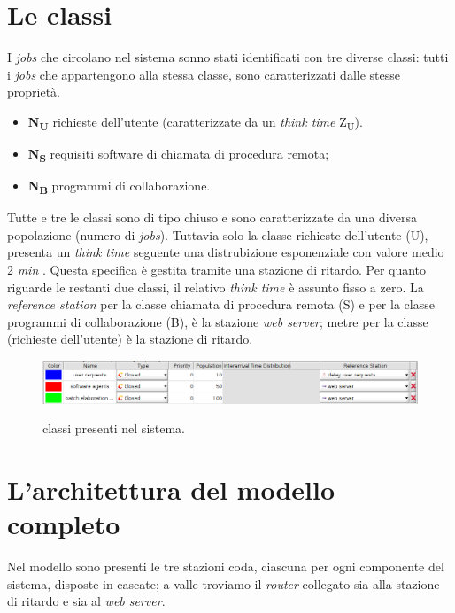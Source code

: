 \documentclass[../main.tex]{subfiles}
\begin{document}
    \section{Le classi}\label{sec:le-classi}
    I \textit{jobs} che circolano nel sistema sonno stati identificati con tre diverse classi: tutti i \textit{jobs}
    che appartengono alla stessa classe, sono caratterizzati dalle stesse proprietà.
    \begin{itemize}
        \item \textbf{N\textsubscript{U}} richieste dell'utente (caratterizzate da un \textit{think time} Z\textsubscript{U}).
        \item \textbf{N\textsubscript{S}} requisiti software di chiamata di procedura remota;
        \item \textbf{N\textsubscript{B}} programmi di collaborazione.
    \end{itemize}
    Tutte e tre le classi sono di tipo chiuso e sono caratterizzate da una diversa popolazione (numero di \textit{jobs}).
    Tuttavia solo la classe richieste dell'utente (U), presenta un \textit{think time} seguente una distrubizione
    esponenziale con valore medio 2 \textit{min} . Questa specifica è gestita tramite una stazione di ritardo.
    Per quanto riguarde le restanti due classi, il relativo \textit{think time} è assunto fisso a zero.
    La \textit{reference station} per la classe chiamata di procedura remota (S) e per la classe programmi di collaborazione
    (B), è la stazione \textit{web server}; metre per la classe (richieste dell'utente) è la stazione di ritardo.
    \begin{figure}[H]
        \centering
        \includegraphics[scale = 0.5]{assets/classes.png}\\
        \caption[\textit{Classi} del sistema]{classi presenti nel sistema.}
        \label{fig:clssi-del-sistema}
    \end{figure}


    \section{L'architettura del modello completo}\label{sec:l'architettura-del-modello-completo}
    Nel modello sono presenti le tre stazioni coda, ciascuna per ogni componente del sistema, disposte in cascate;
    a valle troviamo il \textit{router} collegato sia alla stazione di ritardo e sia al \textit{web server}.
\end{document}
